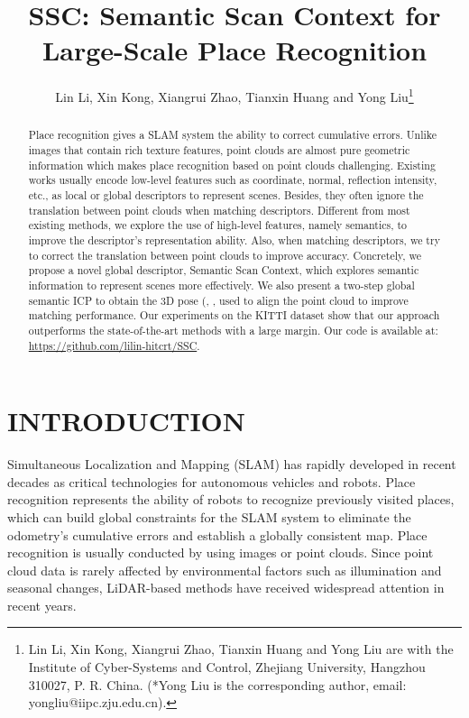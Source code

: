 \documentclass[letterpaper, 10 pt, conference]{ieeeconf}
\title{\LARGE \bf
SSC: Semantic Scan Context for Large-Scale Place Recognition
}
\author{Lin Li, Xin Kong, Xiangrui Zhao, Tianxin Huang and Yong Liu\thanks{Lin Li, Xin Kong, Xiangrui Zhao, Tianxin Huang and Yong Liu are with the Institute of Cyber-Systems and Control, Zhejiang University, Hangzhou 310027, P. R. China. (*Yong Liu is the corresponding author, email: yongliu@iipc.zju.edu.cn).}
}
\begin{document}
\maketitle
\thispagestyle{empty}
\pagestyle{empty}


\begin{abstract}

Place recognition gives a SLAM system the ability to correct cumulative errors. Unlike images that contain rich texture features, point clouds are almost pure geometric information which makes place recognition based on point clouds challenging. Existing works usually encode low-level features such as coordinate, normal, reflection intensity, etc., as local or global descriptors to represent scenes. Besides, they often ignore the translation between point clouds when matching descriptors. Different from most existing methods, we explore the use of high-level features, namely semantics, to improve the descriptor's representation ability. Also, when matching descriptors, we try to correct the translation between point clouds to improve accuracy. Concretely, we propose a novel global descriptor, Semantic Scan Context, which explores semantic information to represent scenes more effectively. We also present a two-step global semantic ICP to obtain the 3D pose (, ,  used to align the point cloud to improve matching performance. Our experiments on the KITTI dataset show that our approach outperforms the state-of-the-art methods with a large margin. Our code is available at: \url{https://github.com/lilin-hitcrt/SSC}.

\end{abstract}


\section{INTRODUCTION}

Simultaneous Localization and Mapping (SLAM) has rapidly developed in recent decades as critical technologies for autonomous vehicles and robots. Place recognition represents the ability of robots to recognize previously visited places, which can build global constraints for the SLAM system to eliminate the odometry's cumulative errors and establish a globally consistent map\cite{4633680}. Place recognition is usually conducted by using images or point clouds. Since point cloud data is rarely affected by environmental factors such as illumination and seasonal changes, LiDAR-based methods have received widespread attention in recent years.
\end{document}
